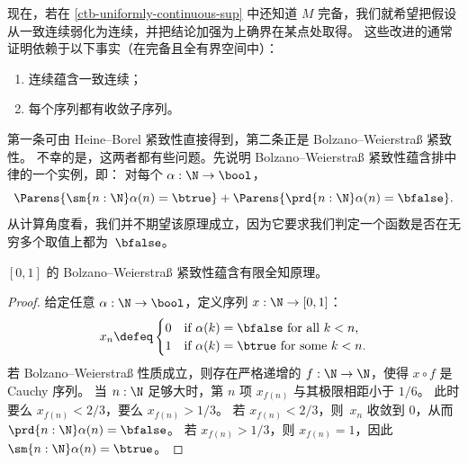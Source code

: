 现在，若在 \cref{ctb-uniformly-continuous-sup} 中还知道 $M$ 完备，我们就希望把假设从一致连续弱化为连续，并把结论加强为上确界在某点处取得。
这些改进的通常证明依赖于以下事实（在完备且全有界空间中）：
%
\begin{enumerate}
\item 连续蕴含一致连续；
\item 每个序列都有收敛子序列。
\end{enumerate}
%
第一条可由 Heine--Borel 紧致性直接得到，第二条正是 Bolzano--Weierstra\ss{} 紧致性。
%
不幸的是，这两者都有些问题。先说明 Bolzano--Weierstra\ss{} 紧致性蕴含排中律的一个实例，即：
%
%
对每个 $\alpha : \N \to \bool$，
%
\begin{equation} \label{eq:lpo}
  \Parens{\sm{n : \N} \alpha(n) = \btrue} +
  \Parens{\prd{n : \N} \alpha(n) = \bfalse}.
\end{equation}
%
从计算角度看，我们并不期望该原理成立，因为它要求我们判定一个函数是否在无穷多个取值上都为~$\bfalse$。

\begin{thm} \label{analysis-bw-lpo}
  $[0,1]$ 的 Bolzano--Weierstra\ss{} 紧致性蕴含有限全知原理。
\end{thm}

\begin{proof}
  给定任意 $\alpha : \N \to \bool$，定义序列 $x : \N \to [0,1]$：
  \begin{equation*}
    x_n \defeq
    \begin{cases}
      0 & \text{if $\alpha(k) = \bfalse$ for all $k < n$,}\\
      1 & \text{if $\alpha(k) = \btrue$ for some $k < n$}.
    \end{cases}
  \end{equation*}
  若 Bolzano--Weierstra\ss{} 性质成立，则存在严格递增的 $f : \N \to
  \N$，使得 $x \circ f$ 是 Cauchy 序列。
  当 $n :
  \N$ 足够大时，第 $n$ 项 $x_{f(n)}$ 与其极限相距小于 $1/6$。
  此时要么 $x_{f(n)} < 2/3$，要么 $x_{f(n)} > 1/3$。
  若 $x_{f(n)} < 2/3$，则~$x_n$ 收敛到 $0$，从而 $\prd{n : \N}
  \alpha(n) = \bfalse$。
  若 $x_{f(n)} > 1/3$，则 $x_{f(n)} = 1$，因此 $\sm{n : \N}
  \alpha(n) = \btrue$。
\end{proof}

